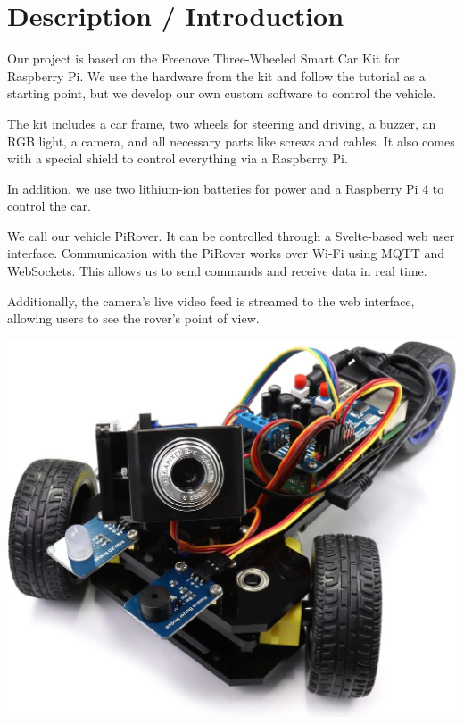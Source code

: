 \section{Description / Introduction}

\noindent
\begin{minipage}[t]{0.63\textwidth}
    \vspace*{0pt}
    Our project is based on the Freenove Three-Wheeled Smart Car Kit for Raspberry Pi. We use the hardware from the kit and follow the tutorial as a starting point, but we develop our own custom software to control the vehicle.

    The kit includes a car frame, two wheels for steering and driving, a buzzer, an RGB light, a camera, and all necessary parts like screws and cables. It also comes with a special shield to control everything via a Raspberry Pi.

    In addition, we use two lithium-ion batteries for power and a Raspberry Pi 4 to control the car.

    We call our vehicle PiRover. It can be controlled through a Svelte-based web user interface. Communication with the PiRover works over Wi-Fi using MQTT and WebSockets. This allows us to send commands and receive data in real time.

    Additionally, the camera’s live video feed is streamed to the web interface, allowing users to see the rover’s point of view.
\end{minipage}
\hfill
\begin{minipage}[t]{0.33\textwidth}
    \vspace*{0pt}
    \includegraphics[width=\linewidth]{img/freenove_smartcar_imagepicture}
\end{minipage}

\vspace{1.5em}
